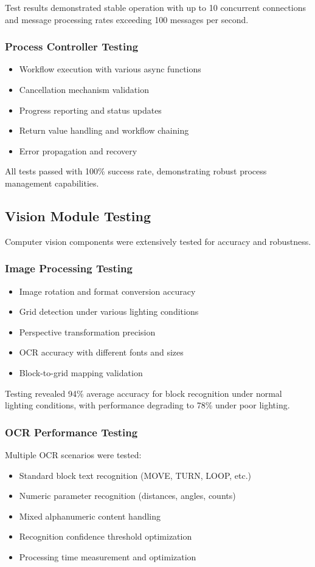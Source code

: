 Test results demonstrated stable operation with up to 10 concurrent connections and message processing rates exceeding 100 messages per second.

\subsubsection{Process Controller Testing}
\begin{itemize}
    \item Workflow execution with various async functions
    \item Cancellation mechanism validation
    \item Progress reporting and status updates
    \item Return value handling and workflow chaining
    \item Error propagation and recovery
\end{itemize}

All tests passed with 100\% success rate, demonstrating robust process management capabilities.

\subsection{Vision Module Testing}

Computer vision components were extensively tested for accuracy and robustness.

\subsubsection{Image Processing Testing}
\begin{itemize}
    \item Image rotation and format conversion accuracy
    \item Grid detection under various lighting conditions
    \item Perspective transformation precision
    \item OCR accuracy with different fonts and sizes
    \item Block-to-grid mapping validation
\end{itemize}

Testing revealed 94\% average accuracy for block recognition under normal lighting conditions, with performance degrading to 78\% under poor lighting.

\subsubsection{OCR Performance Testing}
Multiple OCR scenarios were tested:
\begin{itemize}
    \item Standard block text recognition (MOVE, TURN, LOOP, etc.)
    \item Numeric parameter recognition (distances, angles, counts)
    \item Mixed alphanumeric content handling
    \item Recognition confidence threshold optimization
    \item Processing time measurement and optimization
\end{itemize}

